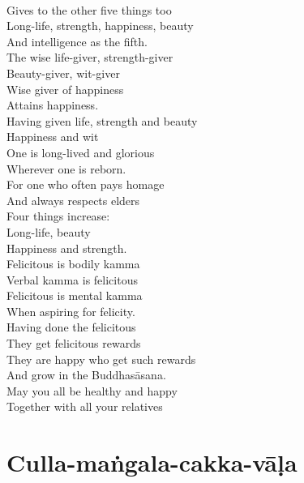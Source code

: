 \begin{english-verses}
  \\
  Gives to the other five things too\\
  Long-life, strength, happiness, beauty\\
  And intelligence as the fifth.\\
  The wise life-giver, strength-giver\\
  Beauty-giver, wit-giver\\
  Wise giver of happiness\\
  Attains happiness.\\
  Having given life, strength and beauty\\
  Happiness and wit\\
  One is long-lived and glorious\\
  Wherever one is reborn.\\
  For one who often pays homage\\
  And always respects elders\\
  Four things increase:\\
  Long-life, beauty\\
  Happiness and strength.\\
  Felicitous is bodily kamma\\
  Verbal kamma is felicitous\\
  Felicitous is mental kamma\\
  When aspiring for felicity.\\
  Having done the felicitous\\
  They get felicitous rewards\\
  They are happy who get such rewards\\
  And grow in the Buddhasāsana.\\
  May you all be healthy and happy\\
  Together with all your relatives
\end{english-verses}

\suttaRef{[AN 5.37 / Dhp 109 / AN 3.155]}

\section{Culla-maṅgala-cakka-vāḷa}
\label{culla-mangala-cakka-vala}

